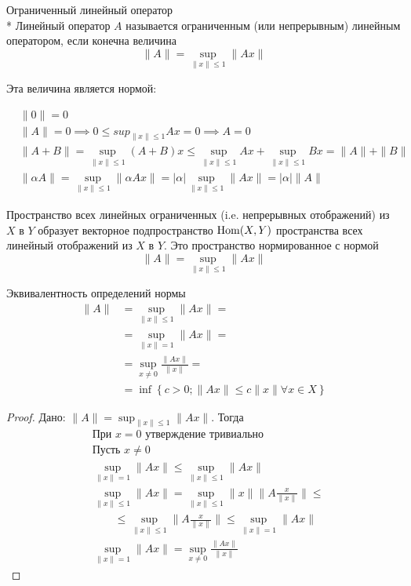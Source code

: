 \begin{dfn}{Ограниченный линейный оператор}\\*
  Линейный оператор $A$
  называется ограниченным (или непрерывным) линейным оператором,
  если конечна величина
  $$\|A\| = \sup_{\|x\|\leq 1} \|A x\|$$

  Эта величина является нормой:

  \begin{align*}
    & \|0\| = 0 \\
    & \|A\| = 0 \implies 0\leq sup_{\|x\|\leq 1} A x = 0 \implies A = 0 \\
    & \|A + B\| = \sup_{\|x\|\leq 1} (A + B) x \leq \sup_{\|x\|\leq 1} A x + \sup_{\|x\|\leq 1} B x = \|A\| + \|B\| \\
    & \|\alpha A\| = \sup_{\|x\|\leq 1} \|\alpha A x\| = \left|\alpha\right| \sup_{\|x\|\leq 1} \|A x\| = \left|\alpha\right| \|A\|
  \end{align*}
\end{dfn}

Пространство всех линейных ограниченных (i.e. непрерывных отображений) из $X$ в $Y$
образует векторное подпространство $\mathrm{Hom}(X, Y)$
пространства всех линейный отображений из $X$ в $Y$.
Это пространство нормированное с нормой
$$\|A\| = \sup_{\|x\|\leq 1} \|A x\|$$

\begin{thm}{Эквивалентность определений нормы}
  \begin{align*}
    \|A\| &= \sup_{\|x\|\leq 1} \|A x\| = \\
          &= \sup_{\|x\|=1} \|A x\| = \\
          &= \sup_{x\neq 0} \frac{\|A x\|}{\|x\|} = \\
          &= \inf\left\{c>0; \|A x\| \leq c\|x\| \forall x\in X \right\}
  \end{align*}
\end{thm}
\begin{proof}
  Дано: $\|A\| = \sup_{\|x\|\leq 1} \|A x\|$.
  Тогда
  \begin{align*}
    &\text{При } x=0 \text{ утверждение тривиально }\\
    &\text{Пусть } x\neq 0\\
    &\sup_{\|x\|=1} \|A x\| \leq \sup_{\|x\|\leq 1} \|A x\| \\
    &\sup_{\|x\|\leq 1} \|A x\| = \sup_{\|x\|\leq 1} \|x\| \|A \frac{x}{\|x\|}\| \leq\\
    &\qquad \leq \sup_{\|x\|\leq 1} \|A \frac{x}{\|x\|}\| \leq \sup_{\|x\|=1} \|A x\| \\
    &\sup_{\|x\|=1} \|A x\| = \sup_{x\neq 0} \frac{\|A x\|}{\|x\|}
  \end{align*}
\end{proof}

